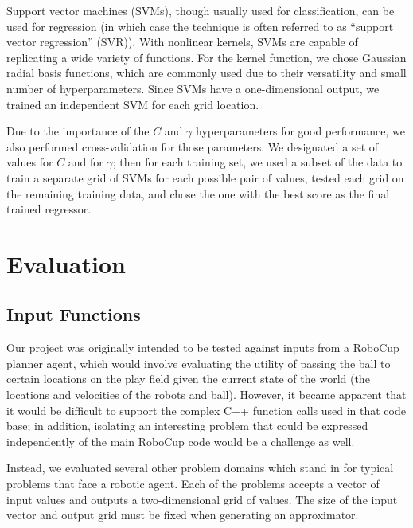 \documentclass{article}
\begin{document}
Support vector machines (SVMs), though usually used for classification, can be used for regression (in which case the technique is often referred to as ``support vector regression'' (SVR)). With nonlinear kernels, SVMs are capable of replicating a wide variety of functions. For the kernel function, we chose Gaussian radial basis functions, which are commonly used due to their versatility and small number of hyperparameters. Since SVMs have a one-dimensional output, we trained an independent SVM for each grid location.

Due to the importance of the $C$ and $\gamma$ hyperparameters for good performance, we also performed cross-validation for those parameters. We designated a set of values for $C$ and for $\gamma$; then for each training set, we used a subset of the data to train a separate grid of SVMs for each possible pair of values, tested each grid on the remaining training data, and chose the one with the best score as the final trained regressor.

\section{Evaluation}

\subsection{Input Functions}

Our project was originally intended to be tested against inputs from a RoboCup planner agent, which would involve evaluating the utility of passing the ball to certain locations on the play field given the current state of the world (the locations and velocities of the robots and ball). However, it became apparent that it would be difficult to support the complex C++ function calls used in that code base; in addition, isolating an interesting problem that could be expressed independently of the main RoboCup code would be a challenge as well.

Instead, we evaluated several other problem domains which stand in for typical problems that face a robotic agent. Each of the problems accepts a vector of input values and outputs a two-dimensional grid of values. The size of the input vector and output grid must be fixed when generating an approximator.
\end{document}
